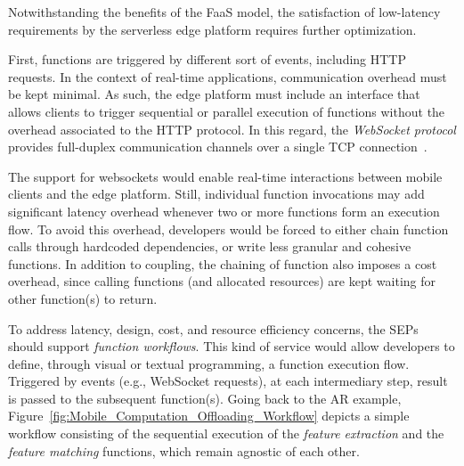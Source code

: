 \documentclass[letterpaper, 10 pt, conference]{ieeeconf}  %
\begin{document}
Notwithstanding the benefits of the FaaS model, the satisfaction of low-latency requirements by the serverless edge platform requires further optimization.

First, functions are triggered by different sort of events, including HTTP requests. In the context of real-time applications, communication overhead must be kept minimal. As such, the edge platform must include an interface that allows clients to trigger sequential or parallel execution of functions without the overhead associated to the HTTP protocol. In this regard, the \textit{WebSocket protocol}
provides full-duplex communication channels over a single TCP connection~\cite{}. %


The support for websockets would enable real-time interactions between mobile clients and the edge platform. Still, individual function invocations may add significant latency overhead whenever two or more functions form an execution flow. To avoid this overhead, developers would be forced to either chain function calls through hardcoded dependencies, or write less granular and cohesive functions. In addition to coupling, the chaining of function also imposes a cost overhead, since calling functions (and allocated resources) are kept waiting for other function(s) to return. 

To address latency, design, cost, and resource efficiency concerns, the SEPs should support \textit{function workflows}. This kind of service would allow developers to define, through visual or textual programming, a function execution flow.
Triggered by events (e.g., WebSocket requests), at each intermediary step, result is passed to the subsequent function(s). Going back to the AR example, Figure~\ref{fig:Mobile_Computation_Offloading_Workflow} depicts a simple workflow consisting of the sequential execution of the \textit{feature extraction} and the \textit{feature matching} functions, which remain agnostic of each other.
\end{document}
